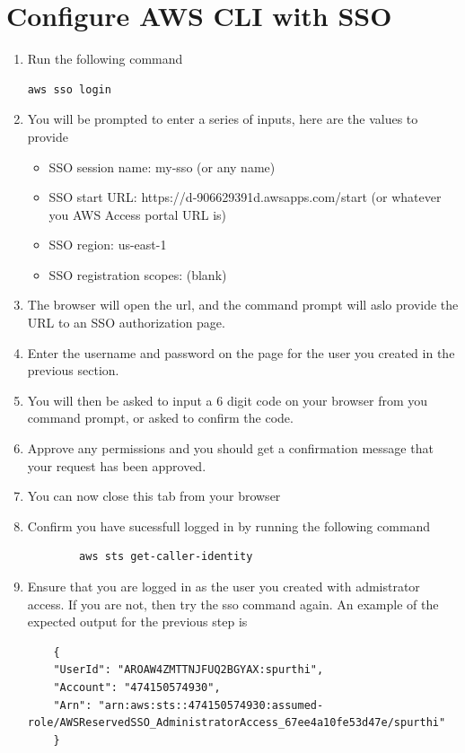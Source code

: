 \section{Configure AWS CLI with SSO}
\begin{enumerate}
    \item Run the following command 
\begin{verbatim}
aws sso login
\end{verbatim}
    \item You will be prompted to enter a series of inputs, here are the values to provide
    \begin{itemize}
      \item SSO session name: my-sso (or any name)
      \item SSO start URL: https://d-906629391d.awsapps.com/start (or whatever you AWS Access portal URL is)
      \item SSO region: us-east-1
      \item SSO registration scopes: (blank)
    \end{itemize}
    \item The browser will open the url, and the command prompt will aslo provide the URL to an SSO authorization page. 
    \item Enter the username and password on the page for the user you created in the previous section. 
    \item You will then be asked to input a 6 digit code on your browser from you command prompt, or asked to confirm the code.
    \item Approve any permissions and you should get a confirmation message that your request has been approved. 
    \item  You can now close this tab from your browser 
    \item Confirm you have sucessfull logged in by running the following command 
    \begin{verbatim}
        aws sts get-caller-identity
    \end{verbatim}
    \item Ensure that you are logged in as the user you created with admistrator access. If you are not, then try the sso command again. An example of the expected output for the previous step is
    \begin{verbatim}
    {
    "UserId": "AROAW4ZMTTNJFUQ2BGYAX:spurthi",
    "Account": "474150574930",
    "Arn": "arn:aws:sts::474150574930:assumed-role/AWSReservedSSO_AdministratorAccess_67ee4a10fe53d47e/spurthi"
    }
    \end{verbatim}
\end{enumerate}


